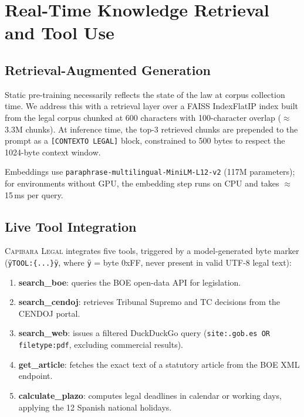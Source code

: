 \documentclass[11pt,a4paper]{article}
\newcommand{\modelname}{\textsc{Capibara Legal}}
\begin{document}
\section{Real-Time Knowledge Retrieval and Tool Use}
\label{sec:rag}

\subsection{Retrieval-Augmented Generation}

Static pre-training necessarily reflects the state of the law at corpus
collection time. We address this with a retrieval layer over a FAISS
IndexFlatIP index built from the legal corpus chunked at 600 characters with
100-character overlap ($\approx$\,3.3M chunks). At inference time, the top-3
retrieved chunks are prepended to the prompt as a \texttt{[CONTEXTO LEGAL]}
block, constrained to 500 bytes to respect the 1024-byte context window.

Embeddings use \texttt{paraphrase-multilingual-MiniLM-L12-v2} (117M
parameters); for environments without GPU, the embedding step runs on CPU and
takes $\approx$\,15\,ms per query.

\subsection{Live Tool Integration}

\modelname{} integrates five tools, triggered by a model-generated byte marker
(\texttt{ÿTOOL:\{...\}ÿ}, where \texttt{ÿ} = byte 0xFF, never present in
valid UTF-8 legal text):

\begin{enumerate}[noitemsep]
  \item \textbf{search\_boe}: queries the BOE open-data API for legislation.
  \item \textbf{search\_cendoj}: retrieves Tribunal Supremo and TC decisions
        from the CENDOJ portal.
  \item \textbf{search\_web}: issues a filtered DuckDuckGo query
        (\texttt{site:.gob.es OR filetype:pdf}, excluding commercial results).
  \item \textbf{get\_article}: fetches the exact text of a statutory article
        from the BOE XML endpoint.
  \item \textbf{calculate\_plazo}: computes legal deadlines in calendar or
        working days, applying the 12 Spanish national holidays.
\end{enumerate}
\end{document}

